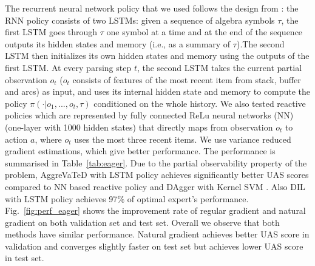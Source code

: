 \documentclass{article}
\begin{document}
The recurrent neural network policy that we used follows the design from \cite{sutskever2014sequence}: the RNN policy consists of two LSTMs: given a sequence of algebra symbols $\tau$, the first LSTM goes through $\tau$ one symbol at a time and at the end of the sequence outputs its hidden states and memory (i.e., as a summary of $\tau$).The second LSTM then initializes its own hidden states and memory using the outputs of the first LSTM. At every parsing step $t$, the second LSTM takes the current partial observation $o_t$ ($o_t$ consists of features of the most recent item from stack, buffer and arcs) as input, and uses its internal hidden state and memory to compute the policy $\pi(\cdot|o_1,...,o_t,\tau)$ conditioned on the whole history. We also tested reactive policies which are represented by fully connected ReLu neural networks (NN) (one-layer with 1000 hidden states) that directly maps from observation $o_t$ to action $a$, where $o_t$ uses the most three recent items. We use variance reduced gradient estimations, which give better performance. The performance is summarised in Table~\ref{tab:eager}. Due to the partial observability property of the problem, AggreVaTeD with LSTM policy achieves significantly better UAS scores compared to NN based reactive policy and DAgger with Kernel SVM \cite{duyckpredicting}. Also DIL with LSTM policy achieves 97$\%$ of optimal expert's performance. Fig.~\ref{fig:perf_eager} shows the improvement rate of regular gradient and natural gradient on both validation set and test set. Overall we observe that both methods have similar performance. Natural gradient achieves better UAS score in validation and converges slightly faster on test set but achieves lower UAS score in test set. 


\end{document}
